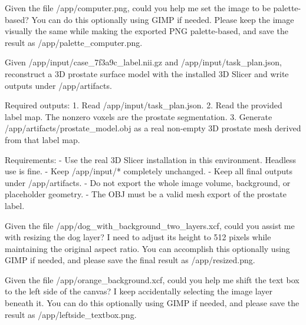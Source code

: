 \begin{instructionbox}
Given the file \textasciigrave{}/app/computer.png\textasciigrave{}, could you help me set the image to be palette-based? You can do this optionally using GIMP if needed. Please keep the image visually the same while making the exported PNG palette-based, and save the result as \textasciigrave{}/app/palette\_computer.png\textasciigrave{}.
\end{instructionbox}

\begin{instructionbox}
Given \textasciigrave{}/app/input/case\_7f3a9c\_label.nii.gz\textasciigrave{} and \textasciigrave{}/app/input/task\_plan.json\textasciigrave{}, reconstruct a 3D prostate surface model with the installed 3D Slicer and write outputs under \textasciigrave{}/app/artifacts\textasciigrave{}.

Required outputs:
1. Read \textasciigrave{}/app/input/task\_plan.json\textasciigrave{}.
2. Read the provided label map. The nonzero voxels are the prostate segmentation.
3. Generate \textasciigrave{}/app/artifacts/prostate\_model.obj\textasciigrave{} as a real non-empty 3D prostate mesh derived from that label map.

Requirements:
- Use the real 3D Slicer installation in this environment. Headless use is fine.
- Keep \textasciigrave{}/app/input/*\textasciigrave{} completely unchanged.
- Keep all final outputs under \textasciigrave{}/app/artifacts\textasciigrave{}.
- Do not export the whole image volume, background, or placeholder geometry.
- The OBJ must be a valid mesh export of the prostate label.
\end{instructionbox}

\begin{instructionbox}
Given the file \textasciigrave{}/app/dog\_with\_background\_two\_layers.xcf\textasciigrave{}, could you assist me with resizing the dog layer? I need to adjust its height to 512 pixels while maintaining the original aspect ratio. You can accomplish this optionally using GIMP if needed, and please save the final result as \textasciigrave{}/app/resized.png\textasciigrave{}.
\end{instructionbox}

\begin{instructionbox}
Given the file \textasciigrave{}/app/orange\_background.xcf\textasciigrave{}, could you help me shift the text box to the left side of the canvas? I keep accidentally selecting the image layer beneath it. You can do this optionally using GIMP if needed, and please save the result as \textasciigrave{}/app/leftside\_textbox.png\textasciigrave{}.
\end{instructionbox}

